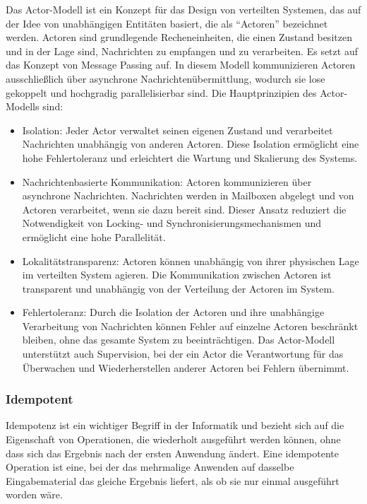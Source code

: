 \documentclass[../vs-script-first-v01.tex]{subfiles}
\begin{document}
Das Actor-Modell ist ein Konzept für das Design von verteilten Systemen, das auf der Idee von unabhängigen Entitäten basiert, die als \enquote{Actoren} bezeichnet werden. Actoren sind grundlegende Recheneinheiten, die einen Zustand besitzen und in der Lage sind, Nachrichten zu empfangen und zu verarbeiten. Es setzt auf das Konzept von Message Passing auf. In diesem Modell kommunizieren Actoren ausschließlich über asynchrone Nachrichtenübermittlung, wodurch sie lose gekoppelt und hochgradig parallelisierbar sind. Die Hauptprinzipien des Actor-Modells sind:
\begin{itemize}
\item Isolation: Jeder Actor verwaltet seinen eigenen Zustand und verarbeitet Nachrichten unabhängig von anderen Actoren. Diese Isolation ermöglicht eine hohe Fehlertoleranz und erleichtert die Wartung und Skalierung des Systems.

\item Nachrichtenbasierte Kommunikation: Actoren kommunizieren über asynchrone Nachrichten. Nachrichten werden in Mailboxen abgelegt und von Actoren verarbeitet, wenn sie dazu bereit sind. Dieser Ansatz reduziert die Notwendigkeit von Locking- und Synchronisierungsmechanismen und ermöglicht eine hohe Parallelität.

\item Lokalitätstransparenz: Actoren können unabhängig von ihrer physischen Lage im verteilten System agieren. Die Kommunikation zwischen Actoren ist transparent und unabhängig von der Verteilung der Actoren im System.

\item Fehlertoleranz: Durch die Isolation der Actoren und ihre unabhängige Verarbeitung von Nachrichten können Fehler auf einzelne Actoren beschränkt bleiben, ohne das gesamte System zu beeinträchtigen. Das Actor-Modell unterstützt auch Supervision, bei der ein Actor die Verantwortung für das Überwachen und Wiederherstellen anderer Actoren bei Fehlern übernimmt.
\end{itemize}


\subsubsection{Idempotent}

Idempotenz ist ein wichtiger Begriff in der Informatik und bezieht sich auf die Eigenschaft von Operationen, die wiederholt ausgeführt werden können, ohne dass sich das Ergebnis nach der ersten Anwendung ändert. Eine idempotente Operation ist eine, bei der das mehrmalige Anwenden auf dasselbe Eingabematerial das gleiche Ergebnis liefert, als ob sie nur einmal ausgeführt worden wäre.
\end{document}
